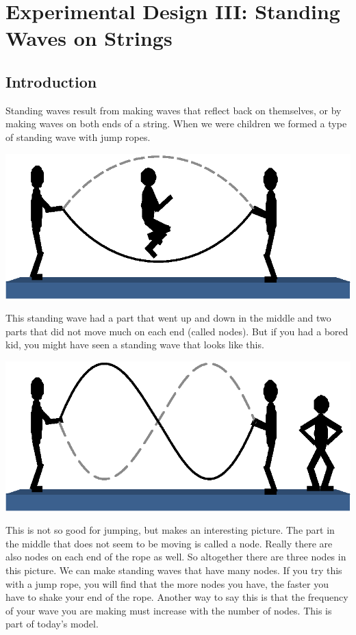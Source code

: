 \documentclass[twoside,11pt,ShortChapTitles]{BYUTextbook}
\begin{document}
\chapter[Experimental Design III]{Experimental Design III: Standing Waves on Strings}

\section{Introduction}

Standing waves result from making waves that reflect back on themselves, or by
making waves on both ends of a string. When we were children we formed a type
of standing wave with jump ropes.
\begin{center}
\includegraphics{Lab6_figs/JumpRope1stHar.eps}
\end{center}
This standing wave had a part that went up and down in the middle and two
parts that did not move much on each end (called nodes). But if you had a
bored kid, you might have seen a standing wave that looks like this.%
\begin{center}
\includegraphics{Lab6_figs/JumpRope2ndHar.eps}
\end{center}
This is not so good for jumping, but makes an interesting picture. The part in
the middle that does not seem to be moving is called a node. Really there are
also nodes on each end of the rope as well. So altogether there are three
nodes in this picture. We can make standing waves that have many nodes. If you
try this with a jump rope, you will find that the more nodes you have, the
faster you have to shake your end of the rope. Another way to say this is that
the frequency of your wave you are making must increase with the number of
nodes. This is part of today's model.
\end{document}
